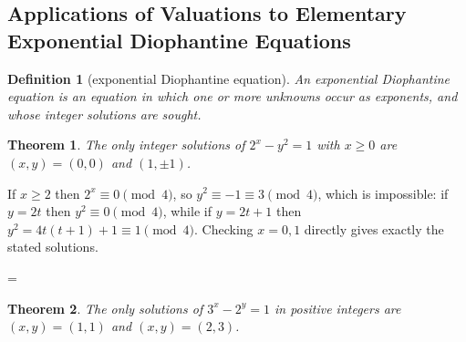 \documentclass[11pt]{article}
\makeatletter
\theoremstyle{ntstyle}
\newtheorem{theorem}{Theorem}[subsection]
\newtheorem{definition}{Definition}[subsection]
\let\nt@closedisplay\]
\def\nt@guardedclose{\@ifnextchar\par{\nt@closeafterpar}{\@ifnextchar\end{\postdisplaypenalty\@M\nt@closedisplay}{\nt@closedisplay}}}
\def\nt@closeafterpar\par{\@ifnextchar\par{\nt@closeafterpar}{\@ifnextchar\end{\postdisplaypenalty\@M\nt@closedisplay\par}{\nt@closedisplay\par}}}
\renewenvironment{proof}[1][\proofname]{\par
  \pushQED{\qed}\normalfont\topsep\medskipamount\edef\nt@afterproof{\@endparpenalty=\the\@endparpenalty\relax}\@beginparpenalty\@M\@endparpenalty\@M\let\]\nt@guardedclose\trivlist\item[]\textit{#1\@addpunct{.}} \ignorespaces}{\ifvmode\addpenalty\@M\fi\popQED\nt@afterproof\endtrivlist\@endpefalse}
\makeatother
\begin{document}
\subsection{Applications of Valuations to Elementary Exponential Diophantine Equations}

\begin{definition}[exponential Diophantine equation]\label{def:4.9.1}
	An exponential Diophantine equation is an equation in which one or more unknowns occur as exponents, and whose integer solutions are sought.

\end{definition}
\begin{theorem}\label{thm:4.9.1}
	The only integer solutions of $2^x-y^2=1$ with $x\ge0$ are $(x,y)=(0,0)$
	and $(1,\pm1)$.

\end{theorem}

\begin{proof} If $x\ge2$ then $2^{x}\equiv0\pmod{4}$, so
	$y^{2}\equiv-1\equiv3\pmod{4}$, which is impossible: if $y=2t$ then
	$y^2\equiv0\pmod4$, while if $y=2t+1$ then
	$y^2=4t(t+1)+1\equiv1\pmod4$. Checking $x=0,1$ directly gives exactly the stated
	solutions.

\end{proof}
\begin{theorem}\label{thm:4.9.2}
	The only solutions of $3^x-2^y=1$ in positive integers are $(x,y)=(1,1)$
	and $(x,y)=(2,3)$.

\end{theorem}
\end{document}
